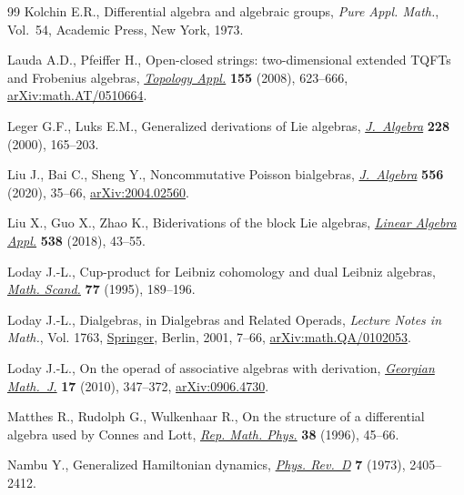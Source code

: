 \begin{thebibliography}{99}
Kolchin E.R., Differential algebra and algebraic groups, \textit{Pure Appl.
 Math.}, Vol.~54, Academic Press, New York, 1973.

Lauda A.D., Pfeiffer H., Open-closed strings: two-dimensional extended {TQFT}s
 and {F}robenius algebras, \href{https://doi.org/10.1016/j.topol.2007.11.005}{\textit{Topology Appl.}} \textbf{155} (2008),
 623--666, \href{https://arxiv.org/abs/math.AT/0510664}{arXiv:math.AT/0510664}.

Leger G.F., Luks E.M., Generalized derivations of {L}ie algebras,
 \href{https://doi.org/10.1006/jabr.1999.8250}{\textit{J.~Algebra}} \textbf{228} (2000), 165--203.

Liu J., Bai C., Sheng Y., Noncommutative {P}oisson bialgebras,
 \href{https://doi.org/10.1016/j.jalgebra.2020.03.009}{\textit{J.~Algebra}} \textbf{556} (2020), 35--66, \href{https://arxiv.org/abs/2004.02560}{arXiv:2004.02560}.

Liu X., Guo X., Zhao K., Biderivations of the block {L}ie algebras,
 \href{https://doi.org/10.1016/j.laa.2017.10.011}{\textit{Linear Algebra Appl.}} \textbf{538} (2018), 43--55.

Loday J.-L., Cup-product for {L}eibniz cohomology and dual {L}eibniz algebras,
 \href{https://doi.org/10.7146/math.scand.a-12560}{\textit{Math. Scand.}} \textbf{77} (1995), 189--196.

Loday J.-L., Dialgebras, in Dialgebras and Related Operads, \textit{Lecture
 Notes in Math.}, Vol. 1763, \href{https://doi.org/10.1007/3-540-45328-8_2}{Springer}, Berlin, 2001, 7--66,
 \href{https://arxiv.org/abs/math.QA/0102053}{arXiv:math.QA/0102053}.

Loday J.-L., On the operad of associative algebras with derivation,
 \href{https://doi.org/10.1515/gmj.2010.010}{\textit{Georgian Math.~J.}} \textbf{17} (2010), 347--372, \href{https://arxiv.org/abs/0906.4730}{arXiv:0906.4730}.

Matthes R., Rudolph G., Wulkenhaar R., On the structure of a differential
 algebra used by {C}onnes and {L}ott, \href{https://doi.org/10.1016/0034-4877(96)87677-4}{\textit{Rep. Math. Phys.}} \textbf{38}
 (1996), 45--66.

Nambu Y., Generalized {H}amiltonian dynamics, \href{https://doi.org/10.1103/PhysRevD.7.2405}{\textit{Phys. Rev.~D}} \textbf{7}
 (1973), 2405--2412.


\end{thebibliography}
